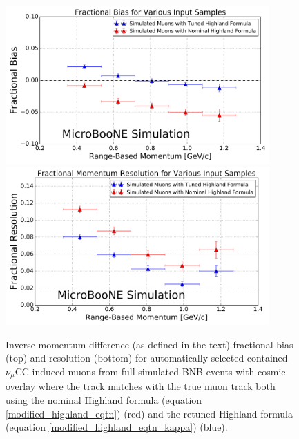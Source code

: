 \documentclass[a4paper,11pt]{article}
\begin{document}
\begin{figure}
\centering
	\includegraphics[width=0.9\textwidth]{Figures/MCS_range_bias_compareHighlandTuning_publicplot.png}
	\includegraphics[width=0.9\textwidth]{Figures/MCS_range_resolution_compareHighlandTuning_publicplot.png}
\caption{Inverse momentum difference (as defined in the text) fractional bias (top) and resolution (bottom) for automatically selected contained $\nu_\mu$CC-induced muons from full simulated BNB events with cosmic overlay where the track matches with the true muon track both using the nominal Highland formula (equation \ref{modified_highland_eqtn}) (red) and the retuned Highland formula (equation \ref{modified_highland_eqtn_kappa}) (blue).}\label{MCS_range_bias_resolution_compareHighlandFormulas_fig}
\end{figure}
\end{document}
